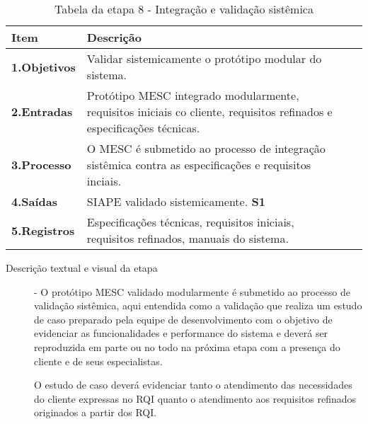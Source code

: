 \begin{table}[htbp]
	\centering
	\caption{Tabela da etapa 8 - Integração e validação sistêmica}
	\begin{tabular}{|l| p{13.5cm}| c| c| } \hline
		\textbf{Item} 	    & \textbf{Descrição} 
		\\ \hline
		\textbf{1.Objetivos}	   &  
		Validar sistemicamente o protótipo modular do sistema.
		\\ \hline
		\textbf{2.Entradas}	  &		
		Protótipo MESC integrado modularmente, requisitos iniciais co cliente, requisitos refinados e especificações técnicas. 
		\\ \hline	
		\textbf{3.Processo}     &
		O MESC é submetido ao processo de integração sistêmica contra as especificações e requisitos inciais.
		\\ \hline
		\textbf{4.Saídas}		& 
		 SIAPE validado sistemicamente.
		\textbf{S1}  
		\\ \hline
		\textbf{5.Registros}   & 	
		Especificações técnicas, requisitos iniciais, requisitos refinados, manuais do sistema.
		\\ \hline
	\end{tabular}
	\label{T10}\par
\end{table}

\begin{description}
\item[Descrição textual e visual da etapa] - O protótipo MESC validado modularmente é submetido ao processo de validação sistêmica, aqui entendida como a validação que realiza um estudo de caso preparado pela equipe de desenvolvimento com o objetivo de evidenciar as funcionalidades  e performance do sistema e deverá ser reproduzida em parte ou no todo na próxima etapa com a presença do cliente e de seus especialistas. \par 
O estudo de caso deverá evidenciar tanto o atendimento das necessidades do cliente expressas no RQI quanto o atendimento aos requisitos refinados originados a partir dos RQI.\par 
\end{description}


